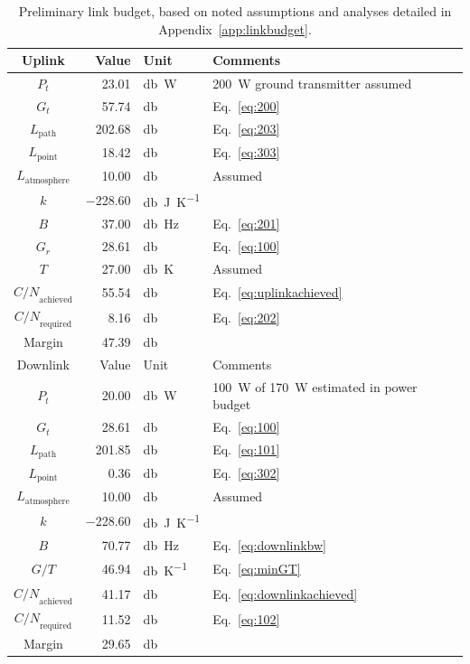 \documentclass[9pt]{article}
\begin{document}
\begin{table}[h]
  \centering
  \captionsetup{width=.75\linewidth,font=small,labelfont=bf}
  \begin{tabular}{c|rl|l}
    \toprule
    Uplink & Value & Unit & Comments \\
    \midrule
    $P_t$ & \num{23.01} & \si{\decibel\watt} & \qty{200}{\watt} ground transmitter assumed\\
    $G_t$ & \num{57.74} & \si{\decibel} & Eq.~\ref{eq:200}\\
    $L_\text{path}$ & \num{202.68} & \si{\decibel} & Eq.~\ref{eq:203}\\
    $L_\text{point}$ & \num{18.42} & \si{\decibel} & Eq.~\ref{eq:303}\\
    $L_\text{atmosphere}$ & \num{10.00} & \si{\decibel} & Assumed\\
    $k$ & \num{-228.60} & \si{\decibel\joule\per\kelvin} & \\
    $B$ & \num{37.00} & \si{\decibel\hertz} & Eq.~\ref{eq:201}\\
    $G_r$ & \num{28.61} & \si{\decibel} & Eq.~\ref{eq:100}\\
    $T$ & \num{27.00} & \si{\decibel\kelvin} & Assumed\\
    \midrule
    ${C/N}_\text{achieved}$ & \num{55.54} & \si{\decibel} & Eq.~\ref{eq:uplinkachieved}\\
    ${C/N}_\text{required}$ & \num{8.16} & \si{\decibel} & Eq.~\ref{eq:202}\\
    \midrule
    Margin & \num{47.39} & \si{\decibel}& \\
    \bottomrule \toprule
    Downlink & Value & Unit & Comments\\
    $P_t$ & \num{20.00} & \si{\decibel\watt} & \qty{100}{\watt} of \qty{170}{\watt} estimated in power budget\\
    $G_t$ & \num{28.61} & \si{\decibel} & Eq.~\ref{eq:100}\\
    $L_\text{path}$ & \num{201.85} & \si{\decibel} & Eq.~\ref{eq:101}\\
    $L_\text{point}$ & \num{0.36} & \si{\decibel} & Eq.~\ref{eq:302}\\
    $L_\text{atmosphere}$ & \num{10.00} & \si{\decibel} & Assumed\\
    $k$ & \num{-228.60} & \si{\decibel\joule\per\kelvin} & \\
    $B$ & \num{70.77} & \si{\decibel\hertz} & Eq.~\ref{eq:downlinkbw}\\
    $G/T$ & \num{46.94} & \si{\decibel\per\kelvin} & Eq.~\ref{eq:minGT}\\
    \midrule
    ${C/N}_\text{achieved}$ & \num{41.17} & \si{\decibel} & Eq.~\ref{eq:downlinkachieved}\\
    ${C/N}_\text{required}$ & \num{11.52} & \si{\decibel} & Eq.~\ref{eq:102}\\
    \midrule
    Margin & \num{29.65} & \si{\decibel} & \\
    \bottomrule
  \end{tabular}
  \caption{Preliminary link budget, based on noted assumptions and analyses detailed in Appendix~\ref{app:linkbudget}.}
  \label{tab:link}
\end{table}
\end{document}
